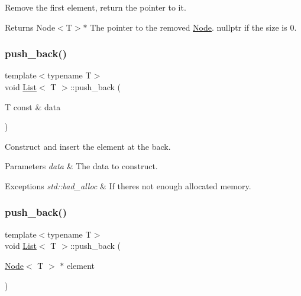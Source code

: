 Remove the first element, return the pointer to it. 

\begin{DoxyReturn}{Returns}
Node$<$\+T$>$$\ast$ The pointer to the removed \hyperlink{struct_node}{Node}. {\ttfamily nullptr} if the size is 0. 
\end{DoxyReturn}
\mbox{\label{class_list_afc370c46b52217d24992076d66e78c2e}} 
\subsubsection{\texorpdfstring{push\+\_\+back()}{push\_back()}\hspace{0.1cm}{\footnotesize\ttfamily [1/2]}}
{\footnotesize\ttfamily template$<$typename T$>$ \\
void \hyperlink{class_list}{List}$<$ T $>$\+::push\+\_\+back (\begin{DoxyParamCaption}\item[{T const \&}]{data }\end{DoxyParamCaption})\hspace{0.3cm}{\ttfamily [inline]}}



Construct and insert the element at the back. 


\begin{DoxyParams}{Parameters}
{\em data} & The data to construct.\\
\hline
\end{DoxyParams}

\begin{DoxyExceptions}{Exceptions}
{\em std\+::bad\+\_\+alloc} & If there\textquotesingle{}s not enough allocated memory. \\
\hline
\end{DoxyExceptions}
\mbox{\label{class_list_a36d7022ab9a7fadeb45a5933e64e8bd8}} 
\subsubsection{\texorpdfstring{push\+\_\+back()}{push\_back()}\hspace{0.1cm}{\footnotesize\ttfamily [2/2]}}
{\footnotesize\ttfamily template$<$typename T$>$ \\
void \hyperlink{class_list}{List}$<$ T $>$\+::push\+\_\+back (\begin{DoxyParamCaption}\item[{\hyperlink{struct_node}{Node}$<$ T $>$ $\ast$}]{element }\end{DoxyParamCaption})\hspace{0.3cm}{\ttfamily [inline]}}



